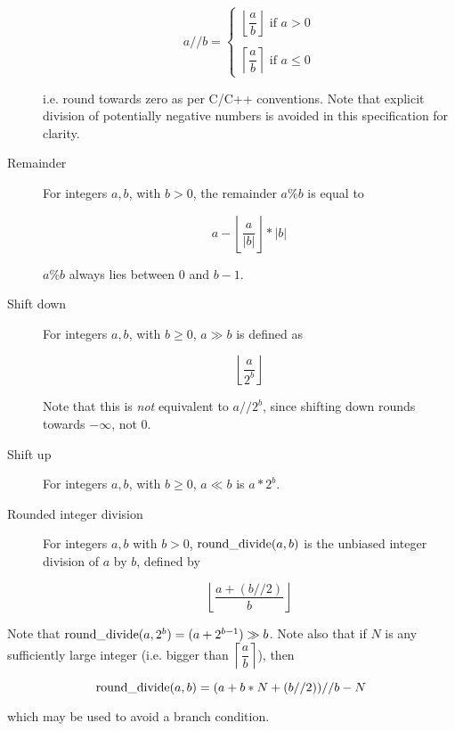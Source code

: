 \begin{description}
\[a//b= \left\{ 
\begin{array}{l} 
\left\lfloor \dfrac{a}{b} \right\rfloor \text{ if } a>0 \\
\\
\left\lceil \dfrac{a}{b} \right\rceil \text{ if } a\leq 0
\end{array} \right.
\]

i.e. round towards zero as per C/C++ conventions. Note that explicit division of potentially negative numbers
is avoided in this specification for clarity.

\item[Remainder] For integers $a,b$, with $b>0$, the remainder $a\%b$ is equal to 

\[a-\left\lfloor\dfrac{a}{\left| b \right|}\right\rfloor *\left| b\right| \]

 $a\%b$ always lies between 0 and $b-1$.

\item[Shift down] For integers $a,b$, with $b\geq 0$, $a\gg b$ is defined as 

\[\left\lfloor\dfrac{a}{2^b}\right\rfloor \]

Note that this is {\em not} equivalent to $a//2^b$, since shifting down rounds towards $-\infty$, not 0.

\item[Shift up] For integers $a,b$, with $b\geq 0$, $a\ll b$ is $a*2^b$.

\item[Rounded integer division] For integers $a,b$ with $b>0$, $\operatorname{round\_divide}(a,b)$ is the unbiased
integer division of $a$ by $b$, defined by

\[\left\lfloor\dfrac{a+(b//2)}{b}\right\rfloor\]

\end{description}

\begin{informative}
Note that $\operatorname{round\_divide}(a,2^b)=(a+2^{b-1})\gg b$. Note also that if $N$ is any sufficiently large integer 
(i.e. bigger than $\left\lceil\dfrac{a}{b}\right\rceil$), then

\[\operatorname{round\_divide}(a,b)=(a+b*N+(b//2))//b - N\]

which may be used to avoid a branch condition.
\end{informative}


